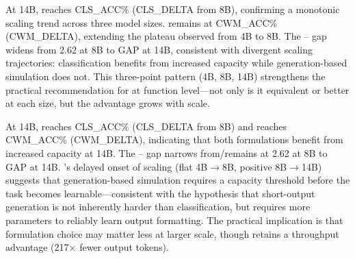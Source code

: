 

At 14B, \cls{} reaches {CLS_ACC}\% ({CLS_DELTA}\pp{} from 8B), confirming a monotonic scaling trend across three model sizes.
\cwm{} remains at {CWM_ACC}\% ({CWM_DELTA}\pp{}), extending the plateau observed from 4B to 8B.
The \cls{}--\cwm{} gap widens from 2.62\pp{} at 8B to {GAP}\pp{} at 14B, consistent with divergent scaling trajectories: classification benefits from increased capacity while generation-based simulation does not.
This three-point pattern (4B, 8B, 14B) strengthens the practical recommendation for \cls{} at function level---not only is it equivalent or better at each size, but the advantage grows with scale.



At 14B, \cls{} reaches {CLS_ACC}\% ({CLS_DELTA}\pp{} from 8B) and \cwm{} reaches {CWM_ACC}\% ({CWM_DELTA}\pp{}), indicating that both formulations benefit from increased capacity at 14B.
The \cls{}--\cwm{} gap {narrows from/remains at} 2.62\pp{} at 8B to {GAP}\pp{} at 14B.
\cwm{}'s delayed onset of scaling (flat 4B$\to$8B, positive 8B$\to$14B) suggests that generation-based simulation requires a capacity threshold before the task becomes learnable---consistent with the hypothesis that short-output generation is not inherently harder than classification, but requires more parameters to reliably learn output formatting.
The practical implication is that formulation choice may matter less at larger scale, though \cls{} retains a throughput advantage (217$\times$ fewer output tokens).







